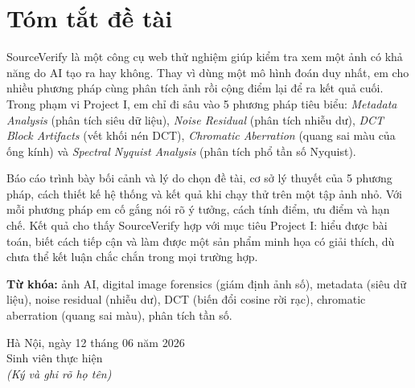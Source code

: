 \chapter*{Tóm tắt đề tài}
SourceVerify là một công cụ web thử nghiệm giúp kiểm tra xem một ảnh có khả năng do AI tạo ra hay không. Thay vì dùng một mô hình đoán duy nhất, em cho nhiều phương pháp cùng phân tích ảnh rồi cộng điểm lại để ra kết quả cuối. Trong phạm vi Project I, em chỉ đi sâu vào 5 phương pháp tiêu biểu: \textit{Metadata Analysis} (phân tích siêu dữ liệu), \textit{Noise Residual} (phân tích nhiễu dư), \textit{DCT Block Artifacts} (vết khối nén DCT), \textit{Chromatic Aberration} (quang sai màu của ống kính) và \textit{Spectral Nyquist Analysis} (phân tích phổ tần số Nyquist).

Báo cáo trình bày bối cảnh và lý do chọn đề tài, cơ sở lý thuyết của 5 phương pháp, cách thiết kế hệ thống và kết quả khi chạy thử trên một tập ảnh nhỏ. Với mỗi phương pháp em cố gắng nói rõ ý tưởng, cách tính điểm, ưu điểm và hạn chế. Kết quả cho thấy SourceVerify hợp với mục tiêu Project I: hiểu được bài toán, biết cách tiếp cận và làm được một sản phẩm minh họa có giải thích, dù chưa thể kết luận chắc chắn trong mọi trường hợp.

\textbf{Từ khóa:} ảnh AI, digital image forensics (giám định ảnh số), metadata (siêu dữ liệu), noise residual (nhiễu dư), DCT (biến đổi cosine rời rạc), chromatic aberration (quang sai màu), phân tích tần số.

\begin{flushright}
Hà Nội, ngày 12 tháng 06 năm 2026\\
\vspace{1cm}
Sinh viên thực hiện\\
\textit{(Ký và ghi rõ họ tên)}
\end{flushright}

\tableofcontents
\listoffigures
\listoftables
\clearpage
